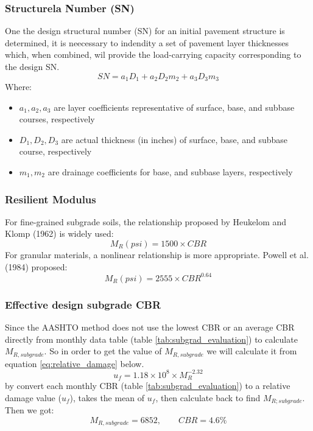 \subsubsection{Structurela Number (SN)}
One the design structural number (SN) for an initial pavement structure is determined, it is
neecessary to indendity a set of pavement layer thicknesses which, when combined, wil provide
the load-carrying capacity corresponding to the design SN.
\begin{equation}
SN = a_1D_1 + a_2D_2m_2 + a_3D_3m_3
\label{eq:strurualnumber}
\end{equation}
Where:
\begin{itemize}
    \item $a_1, a_2, a_3$ are layer coefficients representative of surface, base, and subbase courses, respectively
    \item $D_1, D_2, D_3$ are actual thickness (in inches) of surface, base, and subbase course, respectively
    \item $m_1, m_2$ are drainage coefficients for base, and subbase layers, respectively
\end{itemize}
\subsubsection*{Resilient Modulus}
For fine-grained subgrade soils, the relationship proposed by Heukelom and Klomp (1962) is
widely used:
\begin{equation*}
M_{R}(psi) = 1500 \times CBR
\end{equation*}
For granular materials, a nonlinear relationship is more appropriate. Powell et al. (1984) proposed:
\begin{equation*}
M_R(psi) = 2555 \times CBR^{0.64}
\end{equation*}
\vspace*{-0.5cm}
\subsubsection*{Effective design subgrade CBR}
Since the AASHTO method does not use the lowest CBR or an average CBR directly from
monthly data table (table \ref{tab:subgrad_evaluation}) to calculate $M_{R,subgrade}$. So in order
to get the value of $M_{R,subgrade}$ we will calculate it from equation \ref{eq:relative_damage} below.
\begin{equation}
    u_f = 1.18 \times 10^8 \times M_R^{-2.32}
    \label{eq:relative_damage}
\end{equation}
by convert each monthly CBR (table \ref{tab:subgrad_evaluation}) to a relative damage value ($u_f$),
takes the mean of $u_f$, then calculate back to find $M_{R;subgrade}$.\\
Then we got:
\begin{equation*}
    M_{R,subgrade} = 6852, \qquad CBR = 4.6\%
\end{equation*}
\vspace*{-0.5cm}
